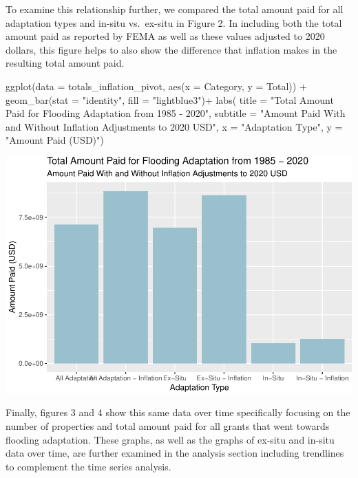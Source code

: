 \documentclass[
  12pt,
]{article}
\newenvironment{Shaded}{\begin{snugshade}}{\end{snugshade}}
\newcommand{\AttributeTok}[1]{\textcolor[rgb]{0.77,0.63,0.00}{#1}}
\newcommand{\FunctionTok}[1]{\textcolor[rgb]{0.00,0.00,0.00}{#1}}
\newcommand{\NormalTok}[1]{#1}
\newcommand{\SpecialCharTok}[1]{\textcolor[rgb]{0.00,0.00,0.00}{#1}}
\newcommand{\StringTok}[1]{\textcolor[rgb]{0.31,0.60,0.02}{#1}}
\begin{document}
To examine this relationship further, we compared the total amount paid
for all adaptation types and in-situ vs.~ex-situ in Figure 2. In
including both the total amount paid as reported by FEMA as well as
these values adjusted to 2020 dollars, this figure helps to also show
the difference that inflation makes in the resulting total amount paid.

\begin{Shaded}
\begin{Highlighting}[]
\FunctionTok{ggplot}\NormalTok{(}\AttributeTok{data =}\NormalTok{ totals\_inflation\_pivot, }\FunctionTok{aes}\NormalTok{(}\AttributeTok{x =}\NormalTok{ Category, }\AttributeTok{y =}\NormalTok{ Total)) }\SpecialCharTok{+}
  \FunctionTok{geom\_bar}\NormalTok{(}\AttributeTok{stat =} \StringTok{"identity"}\NormalTok{, }\AttributeTok{fill =} \StringTok{"lightblue3"}\NormalTok{)}\SpecialCharTok{+}
  \FunctionTok{labs}\NormalTok{( }
    \AttributeTok{title =} \StringTok{"Total Amount Paid for Flooding Adaptation from 1985 {-} 2020"}\NormalTok{, }
    \AttributeTok{subtitle =} \StringTok{"Amount Paid With and Without Inflation Adjustments to 2020 USD"}\NormalTok{,}
    \AttributeTok{x =} \StringTok{"Adaptation Type"}\NormalTok{, }
    \AttributeTok{y =} \StringTok{"Amount Paid (USD)"}\NormalTok{)}
\end{Highlighting}
\end{Shaded}

\includegraphics{finalreport_files/figure-latex/unnamed-chunk-2-1.pdf}

Finally, figures 3 and 4 show this same data over time specifically
focusing on the number of properties and total amount paid for all
grants that went towards flooding adaptation. These graphs, as well as
the graphs of ex-situ and in-situ data over time, are further examined
in the analysis section including trendlines to complement the time
series analysis.
\end{document}

